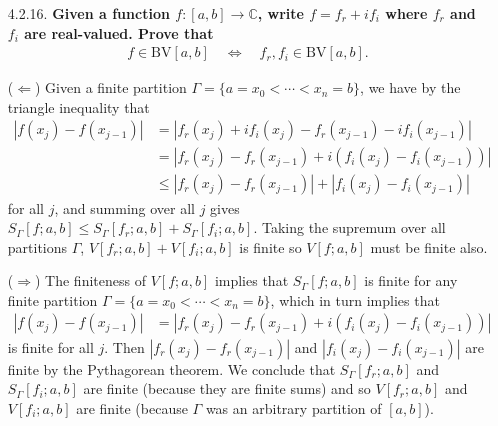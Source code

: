 \documentclass[a4paper,12pt]{article}
\begin{document}
\begin{enumerate}
    \item[4.2.16.]
        \boldmath\textbf{Given a function $f : [a, b] \to \mathbb{C}$, write $f = f_r + if_i$ where $f_r$ and $f_i$ are real-valued. Prove that
        \begin{align*}
            f \in \text{BV}[a, b] \quad \Longleftrightarrow \quad f_r, f_i \in \text{BV}[a, b].
        \end{align*}
        }\unboldmath \par
        ($\Leftarrow$) Given a finite partition
        $\Gamma = \{ a = x_0 < \cdots < x_n = b \}$,
        we have by the triangle inequality that
        \begin{align*}
            |f(x_j) - f(x_{j - 1})| &= |f_r(x_j) + if_i(x_j) - f_r(x_{j - 1}) - if_i(x_{j - 1})| \\
            &= |f_r(x_j) - f_r(x_{j - 1}) + i(f_i(x_j) - f_i(x_{j - 1}))| \\
            &\leq |f_r(x_j) - f_r(x_{j - 1})| + |f_i(x_j) - f_i(x_{j - 1})|
        \end{align*}
        for all $j$, and summing over all $j$ gives $S_\Gamma[f; a, b] \leq S_\Gamma[f_r; a, b] + S_\Gamma[f_i; a, b]$. Taking the supremum over all partitions $\Gamma$, $V[f_r; a, b] + V[f_i; a, b]$ is finite so $V[f; a, b]$ must be finite also. \par
        ($\Rightarrow$) The finiteness of $V[f; a, b]$ implies that $S_\Gamma[f; a, b]$ is finite for any finite partition
        $\Gamma = \{ a = x_0 < \cdots < x_n = b \}$,
        which in turn implies that
        \begin{align*}
            |f(x_j) - f(x_{j - 1})|
            &= |f_r(x_j) - f_r(x_{j - 1}) + i(f_i(x_j) - f_i(x_{j - 1}))|
        \end{align*}
        is finite for all $j$. Then $|f_r(x_j) - f_r(x_{j - 1})|$ and $|f_i(x_j) - f_i(x_{j - 1})|$ are finite by the Pythagorean theorem. We conclude that $S_\Gamma[f_r; a, b]$ and $S_\Gamma[f_i; a, b]$ are finite (because they are finite sums) and so $V[f_r; a, b]$ and $V[f_i; a, b]$ are finite (because $\Gamma$ was an arbitrary partition of $[a, b]$).


\end{enumerate}
\end{document}

